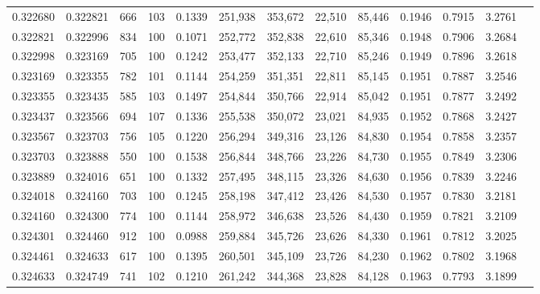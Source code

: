 \begin{tabular}{rrrrrrrrrrrrr}
0.322680 & 0.322821 &   666 & 103 &                                     0.1339 & 251,938 & 353,672 &  22,510 &  85,446 & 0.1946 & 0.7915 & 3.2761 \\
0.322821 & 0.322996 &   834 & 100 &                                     0.1071 & 252,772 & 352,838 &  22,610 &  85,346 & 0.1948 & 0.7906 & 3.2684 \\
0.322998 & 0.323169 &   705 & 100 &                                     0.1242 & 253,477 & 352,133 &  22,710 &  85,246 & 0.1949 & 0.7896 & 3.2618 \\
0.323169 & 0.323355 &   782 & 101 &                                     0.1144 & 254,259 & 351,351 &  22,811 &  85,145 & 0.1951 & 0.7887 & 3.2546 \\
0.323355 & 0.323435 &   585 & 103 &                                     0.1497 & 254,844 & 350,766 &  22,914 &  85,042 & 0.1951 & 0.7877 & 3.2492 \\
0.323437 & 0.323566 &   694 & 107 &                                     0.1336 & 255,538 & 350,072 &  23,021 &  84,935 & 0.1952 & 0.7868 & 3.2427 \\
0.323567 & 0.323703 &   756 & 105 &                                     0.1220 & 256,294 & 349,316 &  23,126 &  84,830 & 0.1954 & 0.7858 & 3.2357 \\
0.323703 & 0.323888 &   550 & 100 &                                     0.1538 & 256,844 & 348,766 &  23,226 &  84,730 & 0.1955 & 0.7849 & 3.2306 \\
0.323889 & 0.324016 &   651 & 100 &                                     0.1332 & 257,495 & 348,115 &  23,326 &  84,630 & 0.1956 & 0.7839 & 3.2246 \\
0.324018 & 0.324160 &   703 & 100 &                                     0.1245 & 258,198 & 347,412 &  23,426 &  84,530 & 0.1957 & 0.7830 & 3.2181 \\
0.324160 & 0.324300 &   774 & 100 &                                     0.1144 & 258,972 & 346,638 &  23,526 &  84,430 & 0.1959 & 0.7821 & 3.2109 \\
0.324301 & 0.324460 &   912 & 100 &                                     0.0988 & 259,884 & 345,726 &  23,626 &  84,330 & 0.1961 & 0.7812 & 3.2025 \\
0.324461 & 0.324633 &   617 & 100 &                                     0.1395 & 260,501 & 345,109 &  23,726 &  84,230 & 0.1962 & 0.7802 & 3.1968 \\
0.324633 & 0.324749 &   741 & 102 &                                     0.1210 & 261,242 & 344,368 &  23,828 &  84,128 & 0.1963 & 0.7793 & 3.1899 \\

\end{tabular}
